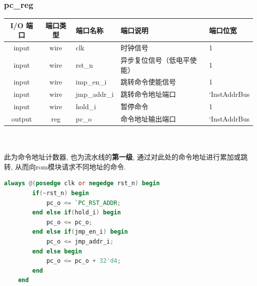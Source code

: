 \documentclass[lang=cn,11pt,a4paper,chinesefont=founder]{elegantpaper}
\begin{document}
\subsubsection{pc\_reg}
\begin{tabular}{cclll}
    \toprule
    I/O 端口 & 端口类型 & 端口名称     & 端口说明                   & 端口位宽     \\
    \midrule
    input    & wire     & clk          & 时钟信号                   & 1            \\
    input    & wire     & rst\_n       & 异步复位信号（低电平使能） & 1            \\
    input    & wire     & imp\_en\_i   & 跳转命令使能信号           & 1            \\
    input    & wire     & jmp\_addr\_i & 跳转命令地址端口           & `InstAddrBus \\
    input    & wire     & hold\_i      & 暂停命令                   & 1            \\
    output   & reg      & pc\_o        & 命令地址输出端口           & `InstAddrBus \\
    \bottomrule
\end{tabular}\\
\\
此为命令地址计数器, 也为流水线的\textbf{第一级}, 通过对此处的命令地址进行累加或跳转, 从而向rom模块请求不同地址的命令. 
\begin{lstlisting}[language=verilog]
    always @(posedge clk or negedge rst_n) begin
		if(~rst_n) begin
			pc_o <= `PC_RST_ADDR;
        end else if(hold_i) begin
			pc_o <= pc_o;
		end else if(jmp_en_i) begin
			pc_o <= jmp_addr_i;
		end else begin
			pc_o <= pc_o + 32'd4;
		end
	end
\end{lstlisting}
\end{document}
